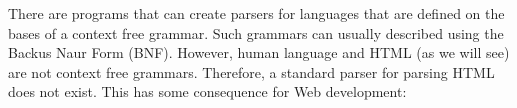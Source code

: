 \documentclass[a4paper, justified, notoc]{tufte-handout} %
\begin{document}
There are programs that can create parsers for languages that are defined on the bases of a context free grammar. 
Such grammars can usually described using the Backus Naur Form (BNF).
However, human language and HTML (as we will see) are not context free grammars. 
Therefore, a standard parser for parsing HTML does not exist. 
This has some consequence for Web development:







%
%
%
\end{document}
